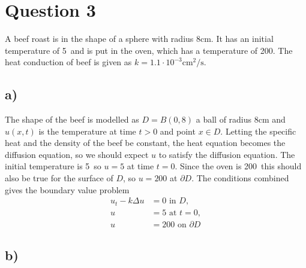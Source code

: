     \section*{Question 3}

    A beef roast is in the shape of a sphere with radius 8cm. It has an initial temperature of 5\celsius\ and is put in the oven, which has a temperature of 200\celsius. The heat conduction of beef is given as $k=1.1\cdot 10^{-3}\text{cm}^2/\text{s}$. 

    \subsection*{a)}

    The shape of the beef is modelled as $D=B(0,8)$ a ball of radius 8cm and $u(x,t)$ is the temperature at time $t>0$ and point $x\in D$. Letting the specific heat and the density of the beef be constant, the heat equation becomes the diffusion equation, so we should expect $u$ to satisfy the diffusion equation. The initial temperature is 5\celsius\ so $u=5$ at time $t=0$. Since the oven is 200\celsius\ this should also be true for the surface of $D$, so $u=200$ at $\partial D$. The conditions combined gives the boundary value problem
    \begin{align}
        u_t - k\Delta u &= 0 \text{ in } D, \nonumber\\
        u &= 5 \text{ at } t=0, \label{eq:pde-beef}\\
        u &= 200 \text{ on } \partial D \nonumber
    \end{align}

    \subsection*{b)}

